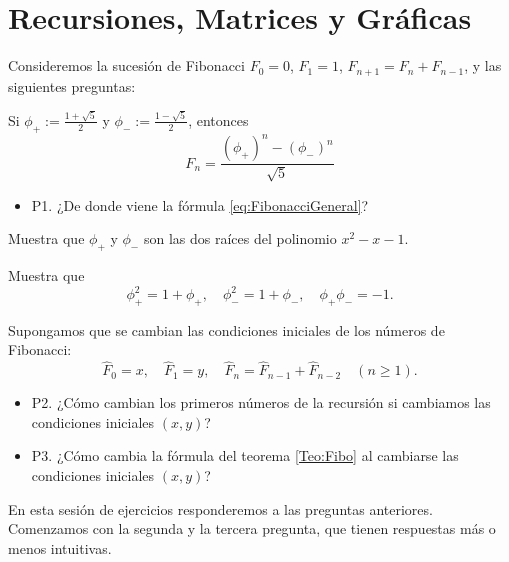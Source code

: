 \setcounter{chapter}{9}

\chapter{Recursiones, Matrices y Gráficas}

Consideremos la sucesión de Fibonacci $F_0=0$, $F_1=1$, $F_{n+1}=F_{n}+F_{n-1}$, y las siguientes preguntas:

\begin{teorema}\label{Teo:Fibo}
Si $\phi_+:=\frac{1+\sqrt{5}}{2}$ y $\phi_-:=\frac{1-\sqrt{5}}{2}$, entonces 
\begin{equation}\label{eq:FibonacciGeneral}
F_n=\frac{(\phi_+)^n-(\phi_-)^n}{\sqrt{5}}
\end{equation}
\end{teorema}

\begin{itemize}
    \item P1. ¿De donde viene la fórmula \ref{eq:FibonacciGeneral}?
\end{itemize}

\begin{ejercicio}
Muestra que $\phi_+$ y $\phi_-$ son las dos raíces del polinomio $x^2-x-1$.

Muestra que $$\phi_+^2=1+\phi_+,\quad \phi_-^2=1+\phi_-,\quad \phi_+\phi_-=-1.$$
\end{ejercicio}

Supongamos que se cambian las condiciones iniciales de los números de Fibonacci:
$$\hat F_0=x,\quad  \hat F_1=y,\quad  \hat F_n=\hat F_{n-1}+\hat F_{n-2} \quad (n\geq 1).$$

\begin{itemize}
    \item P2. ¿Cómo cambian los primeros números de la recursión si cambiamos las condiciones iniciales  $(x,y)$?

    \item P3. ¿Cómo cambia la fórmula del teorema \ref{Teo:Fibo} al cambiarse las condiciones iniciales  $(x,y)$?
\end{itemize}

En esta sesión de ejercicios responderemos a las preguntas anteriores. Comenzamos con la segunda y la tercera pregunta, que tienen respuestas más o menos intuitivas.

